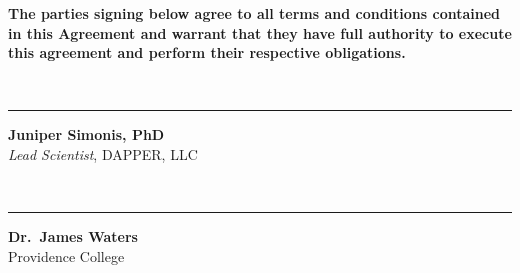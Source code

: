 \documentclass[
  11pt,
]{article}
\begin{document}
\textbf{The parties signing below agree to all terms and conditions
contained in this Agreement and warrant that they have full authority to
execute this agreement and perform their respective obligations.}

~

\noindent

\rule{6cm}{0.4pt}

\textbf{Juniper Simonis, PhD}\\
\emph{Lead Scientist}, DAPPER, LLC

~

\noindent

\rule{6cm}{0.4pt}

\textbf{Dr.~James Waters}\\
Providence College
\end{document}
